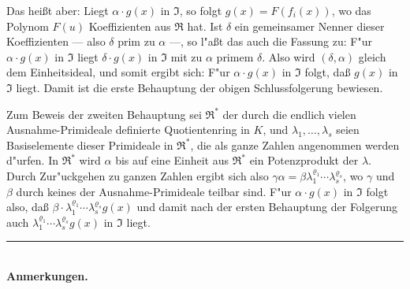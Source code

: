 Das hei\ss t aber: Liegt $\alpha \cdot g(x)$ in $\mathfrak{I}$, so folgt $g(x) = F(f_i(x))$, wo das Polynom $F(u)$ Koeffizienten aus $\mathfrak{R}$ hat. Ist $\delta$ ein gemeinsamer Nenner dieser Koeffizienten --- also $\delta$ prim zu $\alpha$ ---, so l"a\ss t das auch die Fassung zu: F"ur $\alpha \cdot g(x)$ in $\mathfrak{I}$ liegt $\delta \cdot g(x)$ in $\mathfrak{I}$ mit zu $\alpha$ primem $\delta$. Also wird $(\delta, \alpha)$ gleich dem Einheitsideal, und somit ergibt sich: F"ur $\alpha \cdot g(x)$ in $\mathfrak{I}$ folgt, da\ss{} $g(x)$ in $\mathfrak{I}$ liegt. Damit ist die erste Behauptung der obigen Schlussfolgerung bewiesen.

Zum Beweis der zweiten Behauptung sei $\mathfrak{R}^*$ der durch die endlich vielen Ausnahme-Primideale definierte Quotientenring in $K$, und $\lambda_1,\ldots,\lambda_s$ seien Basiselemente dieser Primideale in $\mathfrak{R}^*$, die als ganze Zahlen angenommen werden d"urfen. In $\mathfrak{R}^*$ wird $\alpha$ bis auf eine Einheit aus $\mathfrak{R}^*$ ein Potenzprodukt der $\lambda$. Durch Zur"uckgehen zu ganzen Zahlen ergibt sich also $\gamma\alpha = \beta \lambda_1^{\varrho_1} \cdots \lambda_s^{\varrho_s}$, wo $\gamma$ und $\beta$ durch keines der Ausnahme-Primideale teilbar sind. F"ur $\alpha \cdot g(x)$ in $\mathfrak{I}$ folgt also, da\ss{} $\beta \cdot \lambda_1^{\varrho_1} \cdots \lambda_s^{\varrho_s} g(x)$ und damit nach der ersten Behauptung der Folgerung auch $\lambda_1^{\varrho_1} \cdots \lambda_s^{\varrho_s} g(x)$ in $\mathfrak{I}$ liegt.

\begin{center}
\rule{4cm}{0.4pt}\\[0.6em]
\textbf{Anmerkungen.}
\end{center}

